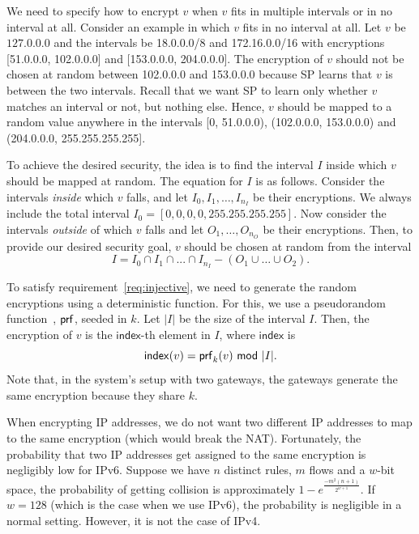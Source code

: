 We need to specify how to encrypt $v$ when $v$ fits in multiple intervals or in no interval at all. Consider an example in which $v$ fits in no interval at all. Let $v$ be $127.0.0.0$ and the intervals be 18.0.0.0/8 and 172.16.0.0/16 with encryptions [51.0.0.0, 102.0.0.0] and [153.0.0.0, 204.0.0.0]. The encryption of $v$ should not be chosen at random between  102.0.0.0 and 153.0.0.0 because SP learns that $v$ is between the two intervals. Recall that we want SP  to learn only whether $v$ matches an interval or not, but nothing else. Hence, $v$ should be mapped to a random value anywhere in the intervals [0, 51.0.0.0), (102.0.0.0, 153.0.0.0) and (204.0.0.0, 255.255.255.255]. 

To achieve the desired security, the idea is to find the interval $I$ inside which $v$ should be mapped at random. The equation for $I$ is as follows. Consider the intervals {\em inside} which $v$ falls, and let $I_0, I_1, \dots, I_{n_I}$ be their encryptions. We always include the total interval $I_0 = [0,0,0,0, 255.255.255.255]$. Now consider the intervals {\em outside} of which $v$ falls and let $O_1, \dots, O_{n_O}$ be their encryptions. Then, to provide our desired security goal, $v$ should be chosen at random from the interval  
\begin{equation}
 I = I_0 \cap I_1 \cap ... \cap I_{n_I} - (O_1 \cup \dots \cup O_2). \label{eq:randominterval}
 \end{equation}

 


To satisfy requirement~\ref{req:injective}, we need to generate the random encryptions using a deterministic function. For this, we use a pseudorandom function~\cite{GoldreichVol1}, $\mathsf{prf}$, seeded in $k$.   Let $|I|$ be the size of the interval $I$. 
Then, the encryption of $v$ is the $\mathsf{index}$-th element in $I$, where $\mathsf{index}$ is 
\[ \mathsf{index}(v) = \prf_k(v)\ \mod\ |I|. \] 
  Note that, in the system's setup with two gateways, the gateways generate the same encryption because they share $k$. 

When encrypting IP addresses, we do not want two different IP addresses to map to the same encryption (which would break the NAT). Fortunately, the probability that two IP addresses get assigned to the same encryption is negligibly low for IPv6. Suppose we have $n$ distinct rules, $m$ flows and a $w$-bit space, the probability of getting collision is approximately $1-e^\frac{-m^2 (n+1)}{2^{w+1}}$. If $w=128$ (which is the case when we use IPv6), the probability is negligible in a normal setting. However, it is not the case of IPv4.

